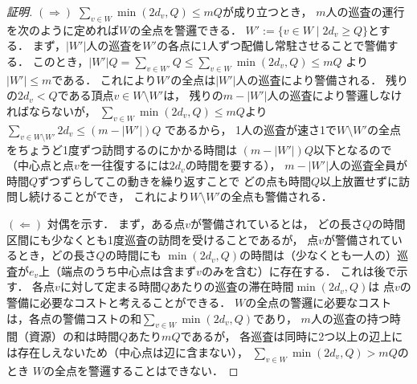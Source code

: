 \begin{proof}[証明]
  $(\Rightarrow)$
  $\sum_{v \in W} \min(2d_v, Q) \leq mQ$が成り立つとき，
  $m$人の巡査の運行を次のように定めれば$W$の全点を警邏できる．
  $W' := \{ v \in W \mid 2d_v \geq Q \}$とする．
  まず，$|W'|$人の巡査を$W'$の各点に1人ずつ配備し常駐させることで警備する．
  このとき，$|W'|Q = \sum_{v \in W'} Q \leq \sum_{v \in W} \min(2d_v, Q) \leq mQ$
  より$|W'| \leq m$である．
  これにより$W'$の全点は$|W'|$人の巡査により警備される．
  残りの$2d_v < Q$である頂点$v \in W \setminus W'$は，
  残りの$m - |W'|$人の巡査により警邏しなければならないが，
  $\sum_{v \in W} \min(2d_v, Q) \leq mQ$より
  $\sum_{v \in W \setminus W'} 2d_v \leq (m - |W'|)Q$
  であるから，
  1人の巡査が速さ1で$W \setminus W'$の全点をちょうど1度ずつ訪問するのにかかる時間は
  $(m - |W'|)Q$以下となるので（中心点と点$v$を一往復するには$2d_v$の時間を要する），
  $m - |W'|$人の巡査全員が時間$Q$ずつずらしてこの動きを繰り返すことで
  どの点も時間$Q$以上放置せずに訪問し続けることができ，
  これにより$W \setminus W'$の全点も警備される．

  $(\Leftarrow)$
  対偶を示す．
  まず，ある点$v$が警備されているとは，
  どの長さ$Q$の時間区間にも少なくとも1度巡査の訪問を受けることであるが，
  点$v$が警備されているとき，どの長さ$Q$の時間にも
  $\min(2d_v, Q)$の時間は（少なくとも一人の）巡査が$e_v$上（端点のうち中心点は含まず$v$のみを含む）に存在する．
  これは後で示す．
  各点$v$に対して定まる時間$Q$あたりの巡査の滞在時間$\min(2d_v, Q)$は
  点$v$の警備に必要なコストと考えることができる．
  $W$の全点の警邏に必要なコストは，各点の警備コストの和$\sum_{v \in W} \min(2d_v, Q)$であり，
  $m$人の巡査の持つ時間（資源）の和は時間$Q$あたり$mQ$であるが，
  各巡査は同時に2つ以上の辺上には存在しえないため（中心点は辺に含まない），
  $\sum_{v \in W} \min(2d_v, Q) > mQ$のとき
  $W$の全点を警邏することはできない．
  

\end{proof}
